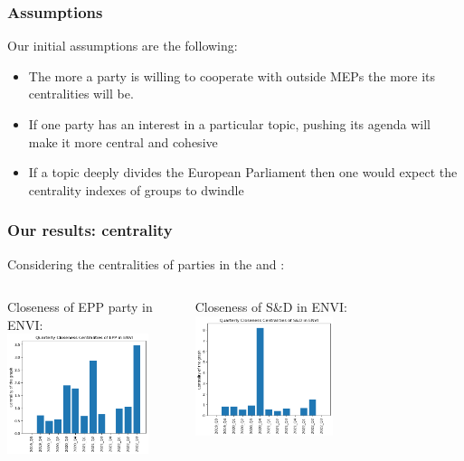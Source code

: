 \documentclass{beamer}
\begin{document}
\begin{frame}
\frametitle{Assumptions}

Our initial assumptions are the following:
\bigskip
\begin{itemize}
	\pause \item The more a party is willing to cooperate with outside MEPs the more its centralities will be.

	\pause \item If one party has an interest in a particular topic, pushing its agenda will make it more central and cohesive
	
	\pause \item If a topic deeply divides the European Parliament then one would expect the centrality indexes of groups to dwindle 
\end{itemize}
\end{frame}

\begin{frame}
\frametitle{Our results: centrality}
	
	Considering the  centralities of parties in the  and :
	\vspace{4mm}
	\pause
	
	\begin{columns}
	\column{5cm}
	Closeness of EPP party in ENVI:
	\\
	\includegraphics[height=3.5cm]{img/EPP_ENVI_Q_closeness.png}

	\pause \column{5cm}
	Closeness of S\&D in ENVI:
	\includegraphics[height=3.5cm]{img/S&D_ENVI_Q_closeness.png}
	
	\end{columns}
\end{frame}
\end{document}
